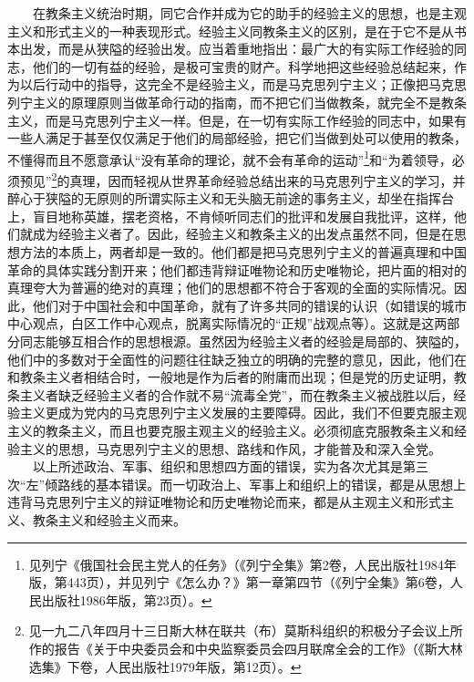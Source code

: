 \documentclass[cn,11pt,chinese]{elegantbook}
\begin{document}
　　在教条主义统治时期，同它合作并成为它的助手的经验主义的思想，也是主观主义和形式主义的一种表现形式。经验主义同教条主义的区别，是在于它不是从书本出发，而是从狭隘的经验出发。应当着重地指出：最广大的有实际工作经验的同志，他们的一切有益的经验，是极可宝贵的财产。科学地把这些经验总结起来，作为以后行动中的指导，这完全不是经验主义，而是马克思列宁主义；正像把马克思列宁主义的原理原则当做革命行动的指南，而不把它们当做教条，就完全不是教条主义，而是马克思列宁主义一样。但是，在一切有实际工作经验的同志中，如果有一些人满足于甚至仅仅满足于他们的局部经验，把它们当做到处可以使用的教条，不懂得而且不愿意承认“没有革命的理论，就不会有革命的运动”\footnote[45]{ 见列宁《俄国社会民主党人的任务》（《列宁全集》第2卷，人民出版社1984年版，第443页），并见列宁《怎么办？》第一章第四节（《列宁全集》第6卷，人民出版社1986年版，第23页）。}和“为着领导，必须预见”\footnote[46]{ 见一九二八年四月十三日斯大林在联共（布）莫斯科组织的积极分子会议上所作的报告《关于中央委员会和中央监察委员会四月联席全会的工作》（《斯大林选集》下卷，人民出版社1979年版，第12页）。}的真理，因而轻视从世界革命经验总结出来的马克思列宁主义的学习，并醉心于狭隘的无原则的所谓实际主义和无头脑无前途的事务主义，却坐在指挥台上，盲目地称英雄，摆老资格，不肯倾听同志们的批评和发展自我批评，这样，他们就成为经验主义者了。因此，经验主义和教条主义的出发点虽然不同，但是在思想方法的本质上，两者却是一致的。他们都是把马克思列宁主义的普遍真理和中国革命的具体实践分割开来；他们都违背辩证唯物论和历史唯物论，把片面的相对的真理夸大为普遍的绝对的真理；他们的思想都不符合于客观的全面的实际情况。因此，他们对于中国社会和中国革命，就有了许多共同的错误的认识（如错误的城市中心观点，白区工作中心观点，脱离实际情况的“正规”战观点等）。这就是这两部分同志能够互相合作的思想根源。虽然因为经验主义者的经验是局部的、狭隘的，他们中的多数对于全面性的问题往往缺乏独立的明确的完整的意见，因此，他们在和教条主义者相结合时，一般地是作为后者的附庸而出现；但是党的历史证明，教条主义者缺乏经验主义者的合作就不易“流毒全党”，而在教条主义被战胜以后，经验主义更成为党内的马克思列宁主义发展的主要障碍。因此，我们不但要克服主观主义的教条主义，而且也要克服主观主义的经验主义。必须彻底克服教条主义和经验主义的思想，马克思列宁主义的思想、路线和作风，才能普及和深入全党。\\
　　以上所述政治、军事、组织和思想四方面的错误，实为各次尤其是第三次“左”倾路线的基本错误。而一切政治上、军事上和组织上的错误，都是从思想上违背马克思列宁主义的辩证唯物论和历史唯物论而来，都是从主观主义和形式主义、教条主义和经验主义而来。\\
\end{document}
